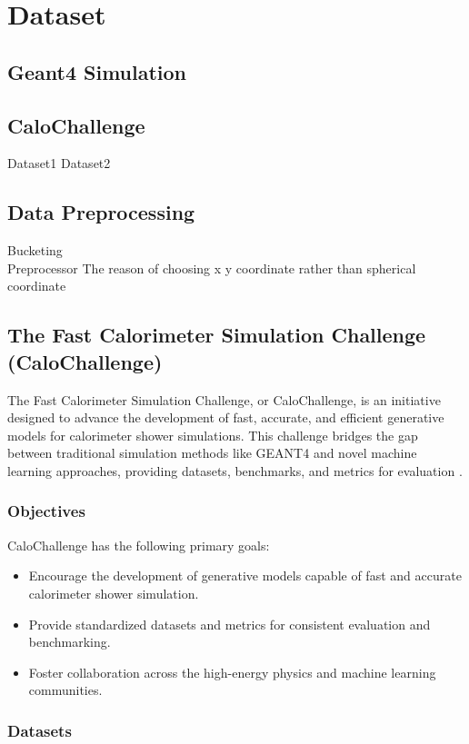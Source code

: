 \chapter{Dataset}
\section{Geant4 Simulation}
\section{CaloChallenge}
Dataset1
Dataset2

\section{Data Preprocessing}
Bucketing\\
Preprocessor
The reason of choosing x y coordinate rather than spherical coordinate

\section{The Fast Calorimeter Simulation Challenge (CaloChallenge)}

The Fast Calorimeter Simulation Challenge, or CaloChallenge, is an initiative designed to advance the development of fast, accurate, and efficient generative models for calorimeter shower simulations. This challenge bridges the gap between traditional simulation methods like GEANT4 and novel machine learning approaches, providing datasets, benchmarks, and metrics for evaluation \cite{calochallenge}.

\subsection{Objectives}

CaloChallenge has the following primary goals:

\begin{itemize}
    \item Encourage the development of generative models capable of fast and accurate calorimeter shower simulation.
    \item Provide standardized datasets and metrics for consistent evaluation and benchmarking.
    \item Foster collaboration across the high-energy physics and machine learning communities.
\end{itemize}

\subsection{Datasets}

